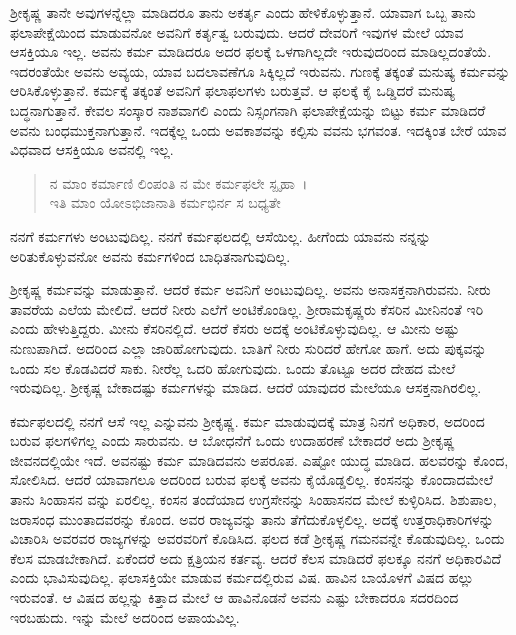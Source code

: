 ಶ‍್ರೀಕೃಷ್ಣ ತಾನೇ ಅವುಗಳನ್ನೆಲ್ಲಾ ಮಾಡಿದರೂ ತಾನು ಅಕರ್ತೃ ಎಂದು ಹೇಳಿಕೊಳ್ಳುತ್ತಾನೆ. ಯಾವಾಗ ಒಬ್ಬ ತಾನು ಫಲಾಪೇಕ್ಷೆಯಿಂದ ಮಾಡುವನೋ ಅವನಿಗೆ ಕರ್ತೃತ್ವ ಬರುವುದು. ಆದರೆ ದೇವರಿಗೆ ಇವುಗಳ ಮೇಲೆ ಯಾವ ಆಸಕ್ತಿಯೂ ಇಲ್ಲ. ಅವನು ಕರ್ಮ ಮಾಡಿದರೂ ಅದರ ಫಲಕ್ಕೆ ಒಳಗಾಗಿಲ್ಲದೇ ಇರುವುದರಿಂದ ಮಾಡಿಲ್ಲದಂತೆಯೆ. ಇದರಂತೆಯೇ ಅವನು ಅವ್ಯಯ, ಯಾವ ಬದಲಾವಣೆಗೂ ಸಿಕ್ಕಿಲ್ಲದೆ ಇರುವನು. ಗುಣಕ್ಕೆ ತಕ್ಕಂತೆ ಮನುಷ್ಯ ಕರ್ಮವನ್ನು ಆರಿಸಿಕೊಳ್ಳುತ್ತಾನೆ. ಕರ್ಮಕ್ಕೆ ತಕ್ಕಂತೆ ಅವನಿಗೆ ಫಲಾಫಲಗಳು ಬರುತ್ತವೆ. ಆ ಫಲಕ್ಕೆ ಕೈ ಒಡ್ಡಿದರೆ ಮನುಷ್ಯ ಬದ್ಧನಾಗುತ್ತಾನೆ. ಕೇವಲ ಸಂಸ್ಕಾರ ನಾಶವಾಗಲಿ ಎಂದು ನಿಸ್ಸಂಗನಾಗಿ ಫಲಾಪೇಕ್ಷೆಯನ್ನು ಬಿಟ್ಟು ಕರ್ಮ ಮಾಡಿದರೆ ಅವನು ಬಂಧಮುಕ್ತನಾಗುತ್ತಾನೆ. ಇದಕ್ಕೆಲ್ಲ ಒಂದು ಅವಕಾಶವನ್ನು ಕಲ್ಪಿಸು ವವನು ಭಗವಂತ. ಇದಕ್ಕಿಂತ ಬೇರೆ ಯಾವ ವಿಧವಾದ ಆಸಕ್ತಿಯೂ ಅವನಲ್ಲಿ ಇಲ್ಲ.

\begin{verse}
ನ ಮಾಂ ಕರ್ಮಾಣಿ ಲಿಂಪಂತಿ ನ ಮೇ ಕರ್ಮಫಲೇ ಸ್ಪೃಹಾ~।\\ಇತಿ ಮಾಂ ಯೋಽಭಿಜಾನಾತಿ ಕರ್ಮಭಿರ್ನ ಸ ಬಧ್ಯತೇ 
\end{verse}

{\small ನನಗೆ ಕರ್ಮಗಳು ಅಂಟುವುದಿಲ್ಲ. ನನಗೆ ಕರ್ಮಫಲದಲ್ಲಿ ಆಸೆಯಿಲ್ಲ. ಹೀಗೆಂದು ಯಾವನು ನನ್ನನ್ನು ಅರಿತುಕೊಳ್ಳುವನೋ ಅವನು ಕರ್ಮಗಳಿಂದ ಬಾಧಿತನಾಗುವುದಿಲ್ಲ.}

ಶ‍್ರೀಕೃಷ್ಣ ಕರ್ಮವನ್ನು ಮಾಡುತ್ತಾನೆ. ಆದರೆ ಕರ್ಮ ಅವನಿಗೆ ಅಂಟುವುದಿಲ್ಲ. ಅವನು ಅನಾಸಕ್ತನಾಗಿರುವನು. ನೀರು ತಾವರೆಯ ಎಲೆಯ ಮೇಲಿದೆ. ಆದರೆ ನೀರು ಎಲೆಗೆ ಅಂಟಿಕೊಂಡಿಲ್ಲ. ಶ‍್ರೀರಾಮಕೃಷ್ಣರು ಕೆಸರಿನ ಮೀನಿನಂತೆ ಇರಿ ಎಂದು ಹೇಳುತ್ತಿದ್ದರು. ಮೀನು ಕೆಸರಿನಲ್ಲಿದೆ. ಆದರೆ ಕೆಸರು ಅದಕ್ಕೆ ಅಂಟಿಕೊಳ್ಳುವುದಿಲ್ಲ. ಆ ಮೀನು ಅಷ್ಟು ನುಣುಪಾಗಿದೆ. ಅದರಿಂದ ಎಲ್ಲಾ ಜಾರಿಹೋಗುವುದು. ಬಾತಿಗೆ ನೀರು ಸುರಿದರೆ ಹೇಗೋ ಹಾಗೆ. ಅದು ಪುಕ್ಕವನ್ನು ಒಂದು ಸಲ ಕೊಡವಿದರೆ ಸಾಕು. ನೀರೆಲ್ಲ ಒದರಿ ಹೋಗುವುದು. ಒಂದು ತೊಟ್ಟೂ ಅದರ ದೇಹದ ಮೇಲೆ ಇರುವುದಿಲ್ಲ. ಶ‍್ರೀಕೃಷ್ಣ ಬೇಕಾದಷ್ಟು ಕರ್ಮಗಳನ್ನು ಮಾಡಿದ. ಆದರೆ ಯಾವುದರ ಮೇಲೆಯೂ ಆಸಕ್ತನಾಗಿರಲಿಲ್ಲ.

ಕರ್ಮಫಲದಲ್ಲಿ ನನಗೆ ಆಸೆ ಇಲ್ಲ ಎನ್ನುವನು ಶ‍್ರೀಕೃಷ್ಣ. ಕರ್ಮ ಮಾಡುವುದಕ್ಕೆ ಮಾತ್ರ ನಿನಗೆ ಅಧಿಕಾರ, ಅದರಿಂದ ಬರುವ ಫಲಗಳಿಗಲ್ಲ ಎಂದು ಸಾರುವನು. ಆ ಬೋಧನೆಗೆ ಒಂದು ಉದಾಹರಣೆ ಬೇಕಾದರೆ ಅದು ಶ‍್ರೀಕೃಷ್ಣ ಜೀವನದಲ್ಲಿಯೇ ಇದೆ. ಅವನಷ್ಟು ಕರ್ಮ ಮಾಡಿದವನು ಅಪರೂಪ. ಎಷ್ಟೋ ಯುದ್ಧ ಮಾಡಿದ. ಹಲವರನ್ನು ಕೊಂದ, ಸೋಲಿಸಿದ. ಆದರೆ ಯಾವಾಗಲೂ ಅದರಿಂದ ಬರುವ ಫಲಕ್ಕೆ ಅವನು ಕೈಯೊಡ್ಡಲಿಲ್ಲ. ಕಂಸನನ್ನು ಕೊಂದಾದಮೇಲೆ ತಾನು ಸಿಂಹಾಸನ ವನ್ನು ಏರಲಿಲ್ಲ. ಕಂಸನ ತಂದೆಯಾದ ಉಗ್ರಸೇನನ್ನು ಸಿಂಹಾಸನದ ಮೇಲೆ ಕುಳ್ಳಿರಿಸಿದ. ಶಿಶುಪಾಲ, ಜರಾಸಂಧ ಮುಂತಾದವರನ್ನು ಕೊಂದ. ಅವರ ರಾಜ್ಯವನ್ನು ತಾನು ತೆಗೆದುಕೊಳ್ಳಲಿಲ್ಲ. ಅದಕ್ಕೆ ಉತ್ತರಾಧಿಕಾರಿಗಳನ್ನು ವಿಚಾರಿಸಿ ಅವರವರ ರಾಜ್ಯಗಳನ್ನು ಅವರವರಿಗೆ ಕೊಡಿಸಿದ. ಫಲದ ಕಡೆ ಶ‍್ರೀಕೃಷ್ಣ ಗಮನವನ್ನೇ ಕೊಡುವುದಿಲ್ಲ. ಒಂದು ಕೆಲಸ ಮಾಡಬೇಕಾಗಿದೆ. ಏಕೆಂದರೆ ಅದು ಕ್ಷತ್ರಿಯನ ಕರ್ತವ್ಯ. ಆದರೆ ಕೆಲಸ ಮಾಡಿದರೆ ಫಲಕ್ಕೂ ನನಗೆ ಅಧಿಕಾರವಿದೆ ಎಂದು ಭಾವಿಸುವುದಿಲ್ಲ. ಫಲಾಸಕ್ತಿಯೇ ಮಾಡುವ ಕರ್ಮದಲ್ಲಿರುವ ವಿಷ. ಹಾವಿನ ಬಾಯೊಳಗೆ ವಿಷದ ಹಲ್ಲು ಇರುವಂತೆ. ಆ ವಿಷದ ಹಲ್ಲನ್ನು ಕಿತ್ತಾದ ಮೇಲೆ ಆ ಹಾವಿನೊಡನೆ ಅವನು ಎಷ್ಟು ಬೇಕಾದರೂ ಸದರದಿಂದ ಇರಬಹುದು. ಇನ್ನು ಮೇಲೆ ಅದರಿಂದ ಅಪಾಯವಿಲ್ಲ.


